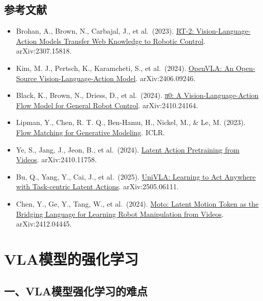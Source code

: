 \hypertarget{ux53c2ux8003ux6587ux732e-152}{%
\subsection{参考文献}\label{ux53c2ux8003ux6587ux732e-152}}

\vspace{0.25em}
\begin{itemize}
\tightlist
\item
  Brohan, A., Brown, N., Carbajal, J., et al.~(2023). \href{https://arxiv.org/abs/2307.15818}{RT-2: Vision-Language-Action Models Transfer Web Knowledge to Robotic Control}. arXiv:2307.15818.
\item
  Kim, M. J., Pertsch, K., Karamcheti, S., et al.~(2024). \href{https://arxiv.org/abs/2406.09246}{OpenVLA: An Open-Source Vision-Language-Action Model}. arXiv:2406.09246.
\item
  Black, K., Brown, N., Driess, D., et al.~(2024). \href{https://arxiv.org/abs/2410.24164}{π0: A Vision-Language-Action Flow Model for General Robot Control}. arXiv:2410.24164.
\item
  Lipman, Y., Chen, R. T. Q., Ben-Hamu, H., Nickel, M., \& Le, M. (2023). \href{https://arxiv.org/abs/2210.02747}{Flow Matching for Generative Modeling}. ICLR.
\item
  Ye, S., Jang, J., Jeon, B., et al.~(2024). \href{https://arxiv.org/abs/2410.11758}{Latent Action Pretraining from Videos}. arXiv:2410.11758.
\item
  Bu, Q., Yang, Y., Cai, J., et al.~(2025). \href{https://arxiv.org/abs/2505.06111}{UniVLA: Learning to Act Anywhere with Task-centric Latent Actions}. arXiv:2505.06111.
\item
  Chen, Y., Ge, Y., Tang, W., et al.~(2024). \href{https://arxiv.org/abs/2412.04445}{Moto: Latent Motion Token as the Bridging Language for Learning Robot Manipulation from Videos}. arXiv:2412.04445.
\end{itemize}

\clearpage

\hypertarget{vlaux6a21ux578bux7684ux5f3aux5316ux5b66ux4e60}{%
\section{VLA模型的强化学习}\label{vlaux6a21ux578bux7684ux5f3aux5316ux5b66ux4e60}}

\hypertarget{ux4e00vlaux6a21ux578bux5f3aux5316ux5b66ux4e60ux7684ux96beux70b9}{%
\subsection{一、VLA模型强化学习的难点}\label{ux4e00vlaux6a21ux578bux5f3aux5316ux5b66ux4e60ux7684ux96beux70b9}}

